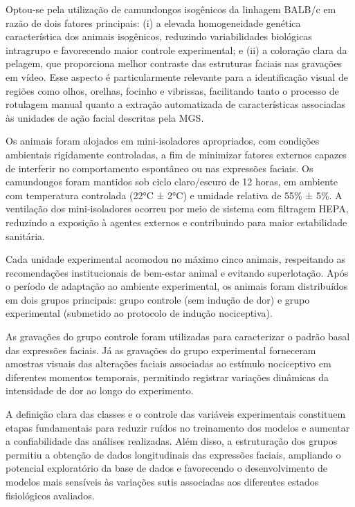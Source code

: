 Optou-se pela utilização de camundongos isogênicos da linhagem BALB/c em razão de dois fatores principais: (i) a elevada homogeneidade genética característica dos animais isogênicos, reduzindo variabilidades biológicas intragrupo e favorecendo maior controle experimental; e (ii) a coloração clara da pelagem, que proporciona melhor contraste das estruturas faciais nas gravações em vídeo. Esse aspecto é particularmente relevante para a identificação visual de regiões como olhos, orelhas, focinho e vibrissas, facilitando tanto o processo de rotulagem manual quanto a extração automatizada de características associadas às unidades de ação facial descritas pela \acs{MGS}.

Os animais foram alojados em mini-isoladores apropriados, com condições ambientais rigidamente controladas, a fim de minimizar fatores externos capazes de interferir no comportamento espontâneo ou nas expressões faciais. Os camundongos foram mantidos sob ciclo claro/escuro de 12 horas, em ambiente com temperatura controlada (22°C ± 2°C) e umidade relativa de 55\% ± 5\%. A ventilação dos mini-isoladores ocorreu por meio de sistema com filtragem \acs{HEPA}, reduzindo a exposição à agentes externos e contribuindo para maior estabilidade sanitária.

Cada unidade experimental acomodou no máximo cinco animais, respeitando as recomendações institucionais de bem-estar animal e evitando superlotação. Após o período de adaptação ao ambiente experimental, os animais foram distribuídos em dois grupos principais: grupo controle (sem indução de dor) e grupo experimental (submetido ao protocolo de indução nociceptiva). 

As gravações do grupo controle foram utilizadas para caracterizar o padrão basal das expressões faciais. Já as gravações do grupo experimental forneceram amostras visuais das alterações faciais associadas ao estímulo nociceptivo em diferentes momentos temporais, permitindo registrar variações dinâmicas da intensidade de dor ao longo do experimento.

A definição clara das classes e o controle das variáveis experimentais constituem etapas fundamentais para reduzir ruídos no treinamento dos modelos e aumentar a confiabilidade das análises realizadas. Além disso, a estruturação dos grupos permitiu a obtenção de dados longitudinais das expressões faciais, ampliando o potencial exploratório da base de dados e favorecendo o desenvolvimento de modelos mais sensíveis às variações sutis associadas aos diferentes estados fisiológicos avaliados.

